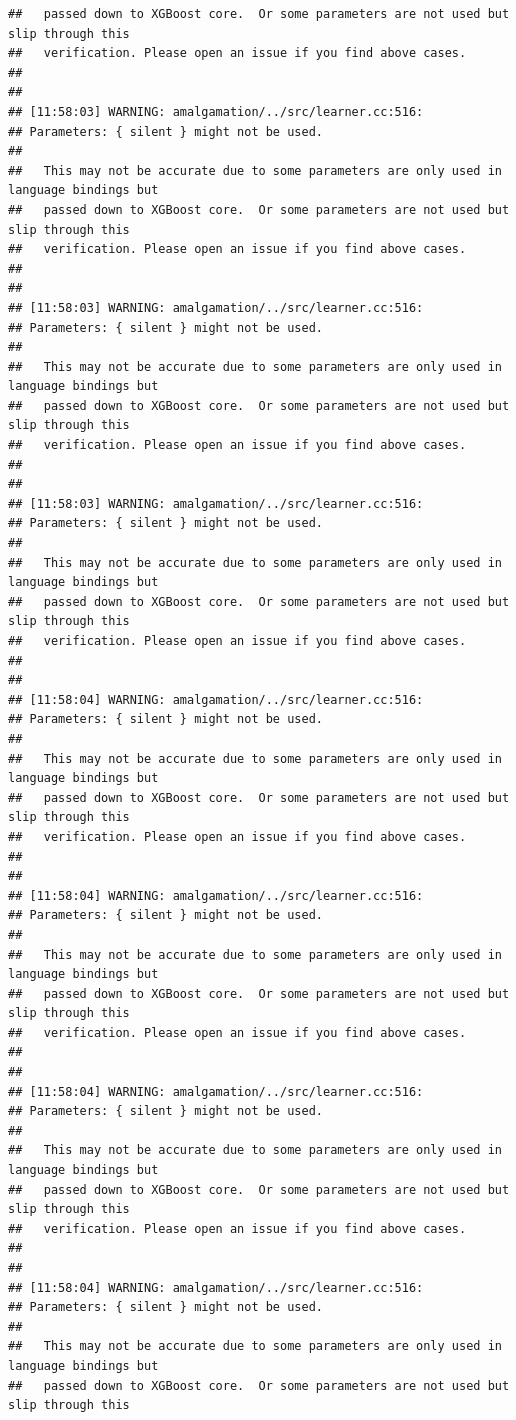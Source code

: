 \documentclass[AMS,STIX2COL]{WileyNJD-v2}\usepackage[]{graphicx}\usepackage[]{color}
\makeatletter
\newenvironment{kframe}{%
 \def\at@end@of@kframe{}%
 \ifinner\ifhmode%
  \def\at@end@of@kframe{\end{minipage}}%
  \begin{minipage}{\columnwidth}%
 \fi\fi%
 \def\FrameCommand##1{\hskip\@totalleftmargin \hskip-\fboxsep
 \colorbox{shadecolor}{##1}\hskip-\fboxsep
     \hskip-\linewidth \hskip-\@totalleftmargin \hskip\columnwidth}%
 \MakeFramed {\advance\hsize-\width
   \@totalleftmargin\z@ \linewidth\hsize
   \@setminipage}}%
 {\par\unskip\endMakeFramed%
 \at@end@of@kframe}
\newenvironment{knitrout}{}{} %
\makeatother
\begin{document}
\begin{knitrout}
\begin{kframe}
\begin{verbatim}
##   passed down to XGBoost core.  Or some parameters are not used but slip through this
##   verification. Please open an issue if you find above cases.
## 
## 
## [11:58:03] WARNING: amalgamation/../src/learner.cc:516: 
## Parameters: { silent } might not be used.
## 
##   This may not be accurate due to some parameters are only used in language bindings but
##   passed down to XGBoost core.  Or some parameters are not used but slip through this
##   verification. Please open an issue if you find above cases.
## 
## 
## [11:58:03] WARNING: amalgamation/../src/learner.cc:516: 
## Parameters: { silent } might not be used.
## 
##   This may not be accurate due to some parameters are only used in language bindings but
##   passed down to XGBoost core.  Or some parameters are not used but slip through this
##   verification. Please open an issue if you find above cases.
## 
## 
## [11:58:03] WARNING: amalgamation/../src/learner.cc:516: 
## Parameters: { silent } might not be used.
## 
##   This may not be accurate due to some parameters are only used in language bindings but
##   passed down to XGBoost core.  Or some parameters are not used but slip through this
##   verification. Please open an issue if you find above cases.
## 
## 
## [11:58:04] WARNING: amalgamation/../src/learner.cc:516: 
## Parameters: { silent } might not be used.
## 
##   This may not be accurate due to some parameters are only used in language bindings but
##   passed down to XGBoost core.  Or some parameters are not used but slip through this
##   verification. Please open an issue if you find above cases.
## 
## 
## [11:58:04] WARNING: amalgamation/../src/learner.cc:516: 
## Parameters: { silent } might not be used.
## 
##   This may not be accurate due to some parameters are only used in language bindings but
##   passed down to XGBoost core.  Or some parameters are not used but slip through this
##   verification. Please open an issue if you find above cases.
## 
## 
## [11:58:04] WARNING: amalgamation/../src/learner.cc:516: 
## Parameters: { silent } might not be used.
## 
##   This may not be accurate due to some parameters are only used in language bindings but
##   passed down to XGBoost core.  Or some parameters are not used but slip through this
##   verification. Please open an issue if you find above cases.
## 
## 
## [11:58:04] WARNING: amalgamation/../src/learner.cc:516: 
## Parameters: { silent } might not be used.
## 
##   This may not be accurate due to some parameters are only used in language bindings but
##   passed down to XGBoost core.  Or some parameters are not used but slip through this

\end{verbatim}
\end{kframe}
\end{knitrout}
\end{document}
